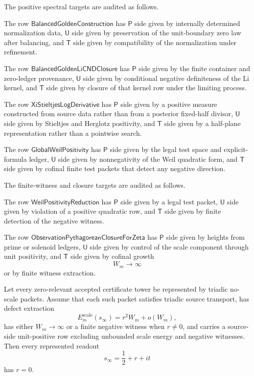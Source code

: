 \begin{definition}
\label{def:rh-audited-positivity-rows}
The positive spectral targets are audited as follows.

The row $\mathsf{BalancedGoldenConstruction}$ has $\mathsf P$ side
given by internally determined normalization data, $\mathsf U$ side
given by preservation of the unit-boundary zero law after balancing,
and $\mathsf T$ side given by compatibility of the normalization under
refinement.

The row $\mathsf{BalancedGoldenLiCNDClosure}$ has $\mathsf P$ side
given by the finite container and zero-ledger provenance, $\mathsf U$
side given by conditional negative definiteness of the Li kernel, and
$\mathsf T$ side given by closure of that kernel row under the limiting
process.

The row $\mathsf{XiStieltjesLogDerivative}$ has $\mathsf P$ side given
by a positive measure constructed from source data rather than from a
posterior fixed-half divisor, $\mathsf U$ side given by Stieltjes and
Herglotz positivity, and $\mathsf T$ side given by a half-plane
representation rather than a pointwise search.

The row $\mathsf{GlobalWeilPositivity}$ has $\mathsf P$ side given by
the legal test space and explicit-formula ledger, $\mathsf U$ side
given by nonnegativity of the Weil quadratic form, and $\mathsf T$ side
given by cofinal finite test packets that detect any negative direction.
\end{definition}

\begin{definition}
\label{def:rh-audited-witness-reduction-rows}
The finite-witness and closure targets are audited as follows.

The row $\mathsf{WeilPositivityReduction}$ has $\mathsf P$ side given by
a legal test packet, $\mathsf U$ side given by violation of a positive
quadratic row, and $\mathsf T$ side given by finite detection of the
negative witness.

The row $\mathsf{ObservationPythagoreanClosureForZeta}$ has
$\mathsf P$ side given by heights from prime or solenoid ledgers,
$\mathsf U$ side given by control of the scale component through unit
positivity, and $\mathsf T$ side given by cofinal growth
$$
W_m\to\infty
$$
or by finite witness extraction.
\end{definition}

\begin{theorem}
\label{thm:rh-triadic-no-scale-criterion}
Let every zero-relevant accepted certificate tower be represented by
triadic no-scale packets.  Assume that each such packet satisfies
triadic source transport, has defect extraction
$$
E_m^{\mathrm{scale}}(s_\infty)=r^2W_m+o(W_m),
$$
has either $W_m\to\infty$ or a finite negative witness when $r\ne0$,
and carries a source-side unit-positive row excluding unbounded scale
energy and negative witnesses.  Then every represented readout
$$
s_\infty=\frac12+r+it
$$
has $r=0$.
\end{theorem}

